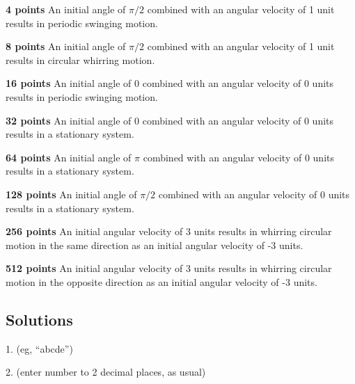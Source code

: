 \textbf{4 points} An initial angle of $\pi/2$ combined with an angular velocity of 1 unit results in periodic swinging motion.

\textbf{8 points} An initial angle of $\pi/2$ combined with an angular velocity of 1 unit results in circular whirring motion.

\textbf{16 points} An initial angle of $0$ combined with an angular velocity of 0 units results in periodic swinging motion.

\textbf{32 points} An initial angle of $0$ combined with an angular velocity of 0 units results in a stationary system.

\textbf{64 points} An initial angle of $\pi$ combined with an angular velocity of 0 units results in a stationary system.

\textbf{128 points} An initial angle of $\pi/2$ combined with an angular velocity of 0 units results in a stationary system.

\textbf{256 points} An initial angular velocity of 3 units results in whirring circular motion in the same direction as an initial angular velocity of -3 units.

\textbf{512 points} An initial angular velocity of 3 units results in whirring circular motion in the opposite direction as an initial angular velocity of -3 units.

\subsection*{Solutions}

1. (eg, ``abcde'') 


2. (enter number to 2 decimal places, as usual) 


